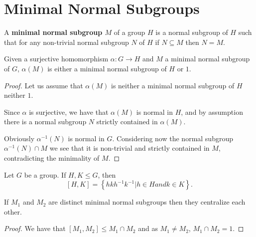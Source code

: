 \section{Minimal Normal Subgroups}

\begin{definition}
    A \textbf{minimal normal subgroup $M$} of a group $H$ is a normal subgroup of $H$ such that for any non-trivial normal subgroup $N$ of $H$ if $N \subseteq M$ then $N = M$.
\end{definition}

\begin{theorem}
    \label{hommnsub}
    Given a surjective homomorphism $\alpha\colon G \rightarrow H$ and $M$ a minimal normal subgroup of $G$, $\alpha(M)$ is either a minimal normal subgroup of $H$ or $1$.
\end{theorem}
\begin{proof}
    Let us assume that $\alpha(M)$ is neither a minimal normal subgroup of $H$ neither $1$.

    Since $\alpha$ is surjective, we have that $\alpha(M)$ is normal in $H$, and by assumption there is a normal subgroup $N$ strictly contained in $\alpha(M)$.
    
    Obviously $\alpha^{-1}(N)$ is normal in $G$. Considering now the normal subgroup $\alpha^{-1}(N) \cap M$ we see that it is non-trivial and strictly contained in $M$, contradicting the minimality of $M$.
\end{proof}

\begin{definition}
    \label{S1:groupcommutator}
    Let $G$ be a group. If $H, K \le G$, then
    $$
    [H,K] = \left\{ hkh^{-1}k^{-1} | h \in H and k \in K \right\}.
    $$ 
\end{definition}

\begin{theorem}
    \label{mnsubsc}
    If $M_1$ and $M_2$ are distinct minimal normal subgroups then they centralize each other.
\end{theorem}

\begin{proof}
    We have that $[ M_1, M_2] \le M_1 \cap M_2$ and as $M_1 \ne M_2$, $M_1 \cap M_2 = 1$.
\end{proof}